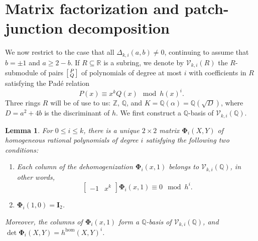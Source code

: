 \documentclass{article}
\numberwithin{equation}{section}
\newtheorem{lem}[thm]{Lemma}
\theoremstyle{definition}
\theoremstyle{remark}
\newcommand{\QQ}{\mathbb{Q}}
\newcommand{\RR}{\mathbb{R}}
\newcommand{\ZZ}{\mathbb{Z}}
\newcommand{\V}{\mathcal{V}}
\newcommand{\<}{\left\langle}
\renewcommand{\>}{\right\rangle}
\begin{document}
\section{Matrix factorization and patch-junction decomposition} \label{sec:matrix_fzn}
We now restrict to the case that all $\Delta_{k,i}(a,b) \neq 0$, continuing to assume that $b = \pm 1$ and $a \geq 2 - b$. If $R \subseteq \RR$ is a subring, we denote by $\V_{k,i}(R)$ the $R$-submodule of pairs $\begin{bsmallmatrix}
  P \\ Q
\end{bsmallmatrix}$ of polynomials of degree at most $i$ with coefficients in $R$ satisfying the Pad\'e relation
\begin{equation}\label{eq:x_pade}
  P(x) \equiv x^k Q(x) \mod h(x)^i.
\end{equation}
Three rings $R$ will be of use to us: $\ZZ$, $\QQ$, and $K = \QQ(\alpha) = \QQ(\sqrt{D})$, where $D = a^2 + 4b$ is the discriminant of $h$. We first construct a $\QQ$-basis of $\V_{k,i}(\QQ)$.
\begin{lem}\label{lem:Phi} For $0 \leq i \leq k$, there is a unique $2 \times 2$ matrix $\boldsymbol{\Phi}_i(X, Y)$ of homogeneous rational polynomials of degree $i$ satisfying the following two conditions:
  \begin{enumerate}[label=\textup{(\roman*)}]
    \item\label{exists:pade} Each column of the dehomogenization $\boldsymbol{\Phi}_i(x, 1)$ belongs to $\V_{k,i}(\QQ)$, in other words,
    \begin{equation} \label{eq:Pade_vec_mat}
      \begin{bmatrix}
        -1 & x^k
      \end{bmatrix} \boldsymbol{\Phi}_i(x, 1) \equiv 0 \mod h^i.
    \end{equation}
    \item\label{exists:ldg} $\boldsymbol{\Phi}_i(1, 0) = \mathbf{I}_2$.
  \end{enumerate}
  Moreover, the columns of $\boldsymbol{\Phi}_i(x, 1)$ form a $\QQ$-basis of $\V_{k,i}(\QQ)$, and $\det \boldsymbol{\Phi}_i(X,Y) = h^{\hom}(X, Y)^i$.
\end{lem}
\end{document}
